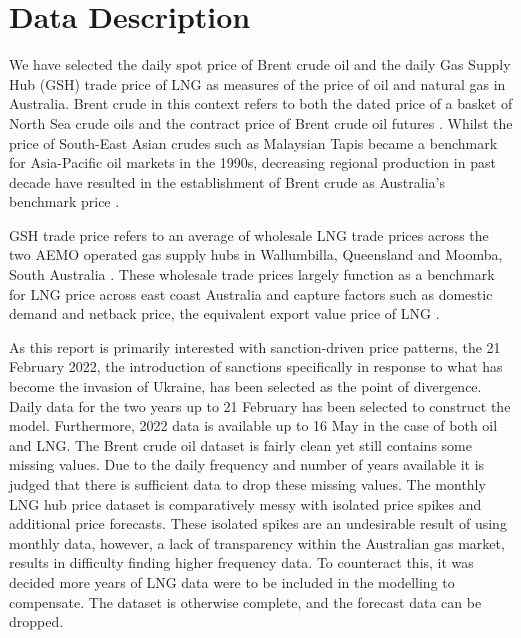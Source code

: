 \section{Data Description}

We have selected the daily spot price of Brent crude oil and the daily Gas Supply Hub (GSH) \cite{mitch1} trade price of LNG as measures of the price of oil and natural gas in Australia. Brent crude in this context refers to both the dated price of a basket of North Sea crude oils and the contract price of Brent crude oil futures \cite{mitch2}. Whilst the price of South-East Asian crudes such as Malaysian Tapis became a benchmark for Asia-Pacific oil markets in the 1990s, decreasing regional production in past decade have resulted in the establishment of Brent crude as Australia’s benchmark price \cite{mitch3}. 
\medskip

GSH trade price refers to an average of wholesale LNG trade prices across the two AEMO operated gas supply hubs in Wallumbilla, Queensland and Moomba, South Australia \cite{mitch1}. These wholesale trade prices largely function as a benchmark for LNG price across east coast Australia and capture factors such as domestic demand and netback price, the equivalent export value price of LNG \cite{mitch4}.
\medskip

As this report is primarily interested with sanction-driven price patterns, the 21 February 2022, the introduction of sanctions specifically in response to what has become the invasion of Ukraine, has been selected as the point of divergence. Daily data for the two years up to 21 February has been selected to construct the model. Furthermore, 2022 data is available up to 16 May in the case of both oil and LNG. The Brent crude oil dataset is fairly clean yet still contains some missing values. Due to the daily frequency and number of years available it is judged that there is sufficient data to drop these missing values. The monthly LNG hub price dataset is comparatively messy with isolated price spikes and additional price forecasts. These isolated spikes are an undesirable result of using monthly data, however, a lack of transparency within the Australian gas market, results in difficulty finding higher frequency data. To counteract this, it was decided more years of LNG data were to be included in the modelling to compensate. The dataset is otherwise complete, and the forecast data can be dropped.


